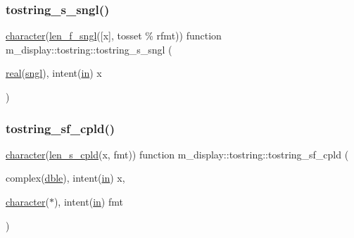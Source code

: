 \subsubsection{\texorpdfstring{tostring\+\_\+s\+\_\+sngl()}{tostring\_s\_sngl()}}
{\footnotesize\ttfamily \hyperlink{option__stopwatch_83_8txt_abd4b21fbbd175834027b5224bfe97e66}{character}(\hyperlink{namespacem__display_ae0feb946fbc4c31f8ba53e20719fa508}{len\+\_\+f\+\_\+sngl}(\mbox{[}x\mbox{]}, tosset \% rfmt)) function m\+\_\+display\+::tostring\+::tostring\+\_\+s\+\_\+sngl (\begin{DoxyParamCaption}\item[{\hyperlink{read__watch_83_8txt_abdb62bde002f38ef75f810d3a905a823}{real}(\hyperlink{namespacem__display_a2ac86bc535c3ccc5947dbb3109c666b5}{sngl}), intent(\hyperlink{M__journal_83_8txt_afce72651d1eed785a2132bee863b2f38}{in})}]{x }\end{DoxyParamCaption})\hspace{0.3cm}{\ttfamily [private]}}

\mbox{\label{interfacem__display_1_1tostring_abca9920dacaf1ab1e0ad0787e13db02c}} 
\subsubsection{\texorpdfstring{tostring\+\_\+sf\+\_\+cpld()}{tostring\_sf\_cpld()}}
{\footnotesize\ttfamily \hyperlink{option__stopwatch_83_8txt_abd4b21fbbd175834027b5224bfe97e66}{character}(\hyperlink{namespacem__display_ace35690c2f36e28f07336cc7dcff47f4}{len\+\_\+s\+\_\+cpld}(x, fmt)) function m\+\_\+display\+::tostring\+::tostring\+\_\+sf\+\_\+cpld (\begin{DoxyParamCaption}\item[{complex(\hyperlink{namespacem__display_a46d90b75b6ccef7ccade133e5847e815}{dble}), intent(\hyperlink{M__journal_83_8txt_afce72651d1eed785a2132bee863b2f38}{in})}]{x,  }\item[{\hyperlink{option__stopwatch_83_8txt_abd4b21fbbd175834027b5224bfe97e66}{character}($\ast$), intent(\hyperlink{M__journal_83_8txt_afce72651d1eed785a2132bee863b2f38}{in})}]{fmt }\end{DoxyParamCaption})\hspace{0.3cm}{\ttfamily [private]}}

